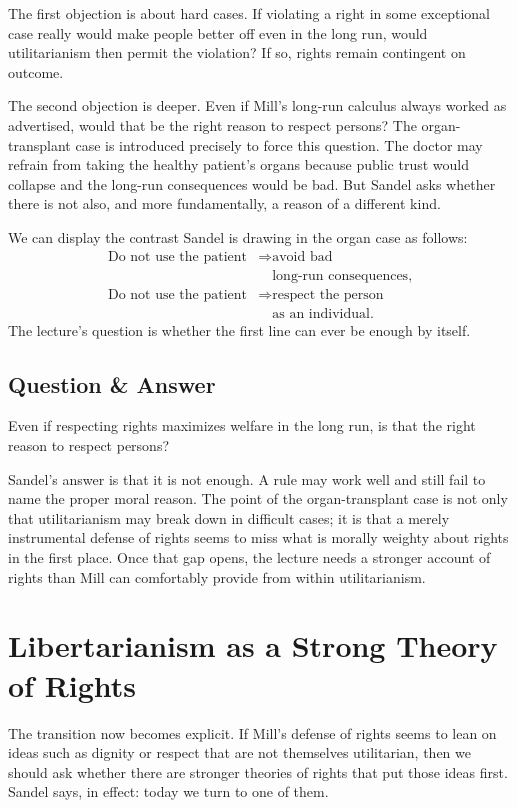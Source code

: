 The first objection is about hard cases. If violating a right in some exceptional case really would make people better off even in the long run, would utilitarianism then permit the violation? If so, rights remain contingent on outcome.

The second objection is deeper. Even if Mill's long-run calculus always worked as advertised, would that be the right reason to respect persons? The organ-transplant case is introduced precisely to force this question. The doctor may refrain from taking the healthy patient's organs because public trust would collapse and the long-run consequences would be bad. But Sandel asks whether there is not also, and more fundamentally, a reason of a different kind.

We can display the contrast Sandel is drawing in the organ case as follows:
\begin{align}
\text{Do not use the patient}
&\Longrightarrow \text{avoid bad} \\
&\quad \text{long-run consequences}, \\
\text{Do not use the patient}
&\Longrightarrow \text{respect the person} \\
&\quad \text{as an individual}.
\end{align}
The lecture's question is whether the first line can ever be enough by itself.

\subsection{Question \& Answer}

Even if respecting rights maximizes welfare in the long run, is that the right reason to respect persons?

Sandel's answer is that it is not enough. A rule may work well and still fail to name the proper moral reason. The point of the organ-transplant case is not only that utilitarianism may break down in difficult cases; it is that a merely instrumental defense of rights seems to miss what is morally weighty about rights in the first place. Once that gap opens, the lecture needs a stronger account of rights than Mill can comfortably provide from within utilitarianism.

\section{Libertarianism as a Strong Theory of Rights}

The transition now becomes explicit. If Mill's defense of rights seems to lean on ideas such as dignity or respect that are not themselves utilitarian, then we should ask whether there are stronger theories of rights that put those ideas first. Sandel says, in effect: today we turn to one of them.


